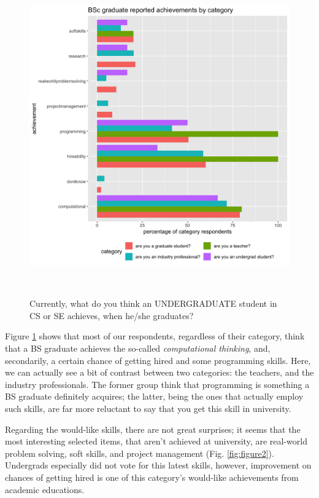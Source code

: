 \documentclass{sigchi}
\begin{document}
\begin{figure}
 \includegraphics[scale=0.2]{../data-analysis/plots_output/BSc_graduate_reported_achievements_by_category.png}
 \caption{Currently, what do you think an UNDERGRADUATE student in CS or SE achieves, when he/she graduates?}~\label{fig:figure1}
\end{figure}

Figure \ref{fig:figure1} shows that most of our respondents, regardless of their category, think that a BS graduate achieves the so-called \textit{computational thinking}, and, secondarily, a certain chance of getting hired and some programming skills. Here, we can actually see a bit of contrast between two categories: the teachers, and the industry professionals. The former group think that programming is something a BS graduate definitely acquires; the latter, being the ones that actually employ such skills, are far more reluctant to say that you get this skill in university.

Regarding the would-like skills, there are not great surprises; it seems that the most interesting selected items, that aren't achieved at university, are real-world problem solving, soft skills, and project management (Fig. \ref{fig:figure2}). Undergrads especially did not vote for this latest skills, however, improvement on chances of getting hired is one of this category's would-like achievements from academic educations.
\end{document}
